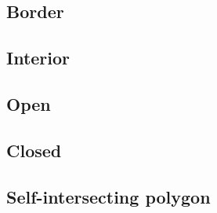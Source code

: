 
\subsection{Border}

\subsection{Interior}

\subsection{Open}

\subsection{Closed}

\subsection{Self-intersecting polygon}



